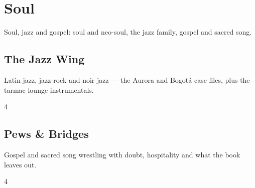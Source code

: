 \documentclass[a4paper,landscape]{memoir}
\begin{document}
\part{Soul}
Soul, jazz and gospel: soul and neo-soul, the jazz family, gospel and sacred song.

\chapter{The Jazz Wing}
Latin jazz, jazz-rock and noir jazz — the Aurora and Bogotá case files, plus the tarmac-lounge instrumentals.
\clearpage\begin{multicols*}{4}
\end{multicols*}

\chapter{Pews \& Bridges}
Gospel and sacred song wrestling with doubt, hospitality and what the book leaves out.
\clearpage\begin{multicols*}{4}
\end{multicols*}
\end{document}
